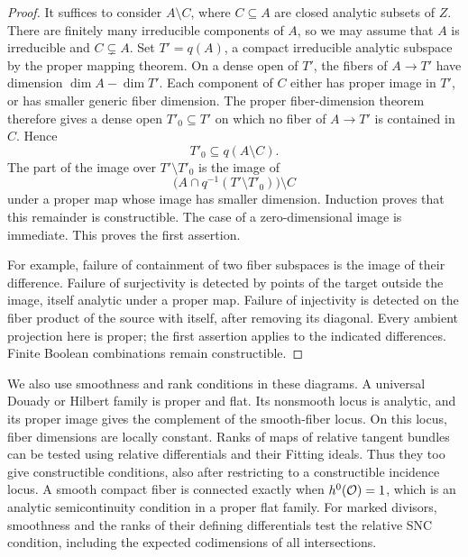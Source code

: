 \begin{proof}
It suffices to consider \(A\setminus C\), where \(C\subseteq A\)
are closed analytic subsets of \(Z\).  There are finitely many
irreducible components of \(A\), so we may assume that \(A\) is
irreducible and \(C\subsetneq A\).  Set \(T'=q(A)\), a compact
irreducible analytic subspace by the proper mapping theorem.
On a dense open of \(T'\), the fibers of \(A\to T'\) have dimension
\(\dim A-\dim T'\).  Each component of \(C\) either has proper image
in \(T'\), or has smaller generic fiber dimension.  The proper
fiber-dimension theorem therefore gives a dense open
\(T'_0\subseteq T'\) on which no fiber of \(A\to T'\) is contained
in \(C\).  Hence
\[
 T'_0\subseteq q(A\setminus C).
\]
The part of the image over \(T'\setminus T'_0\) is the image of
\[
 \bigl(A\cap q^{-1}(T'\setminus T'_0)\bigr)\setminus C
\]
under a proper map whose image has smaller dimension.  Induction
proves that this remainder is constructible.  The case of a
zero-dimensional image is immediate.  This proves the first
assertion.

For example, failure of containment of two fiber subspaces is the
image of their difference.  Failure of surjectivity is detected by
points of the target outside the image, itself analytic under a
proper map.  Failure of injectivity is detected on the fiber product
of the source with itself, after removing its diagonal.  Every
ambient projection here is proper; the first assertion applies
to the indicated differences.  Finite Boolean combinations remain
constructible.
\end{proof}

We also use smoothness and rank conditions in these diagrams.
A universal Douady or Hilbert family is proper and flat.
Its nonsmooth locus is analytic, and its proper image gives the
complement of the smooth-fiber locus.  On this locus, fiber dimensions
are locally constant.  Ranks of maps of relative tangent bundles
can be tested using relative differentials and their Fitting ideals.
Thus they too give constructible conditions, also after restricting
to a constructible incidence locus.  A smooth compact fiber is
connected exactly when \(h^0(\mathcal O)=1\), which is an analytic
semicontinuity condition in a proper flat family.  For marked
divisors, smoothness and the ranks of their defining differentials
test the relative SNC condition, including the expected codimensions
of all intersections.

